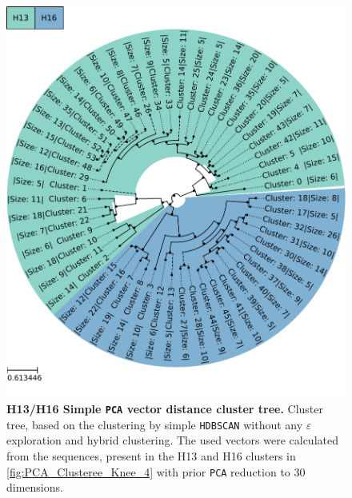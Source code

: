 \begin{figure}[!hbt]
    \centering
    \includegraphics[width=\textwidth]{PCA/Clustertree_Segment_4_H_Simple.pdf}
    \caption[H13/H16 Simple \texttt{PCA} vector distance cluster tree]{\textbf{H13/H16 Simple \texttt{PCA} vector distance cluster tree.} Cluster tree, based on the clustering by simple \texttt{HDBSCAN} without any $\varepsilon$ exploration and hybrid clustering. The used vectors were calculated from the sequences, present in the H13 and H16 clusters in \autoref{fig:PCA_Clusteree_Knee_4} with prior \texttt{PCA} reduction to 30 dimensions.}
    \label{fig:Simple_Clustertree_PCA}
\end{figure}

